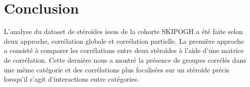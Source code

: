 \chapter{Conclusion}

















L'analyse du dataset de stéroïdes issus de la cohorte SKIPOGH a été faite selon deux approche, corrélation globale et corrélation partielle. La première approche a consisté à comparer les corrélations entre deux stéroïdes à l'aide d'une matrice de corrélation. Cette dernière nous a montré la présence de groupes corrélés dans une même catégorie et des corrélations plus focalisées sur un stéroïde précis lorsqu'il s'agit d'interactions entre catégories. 

